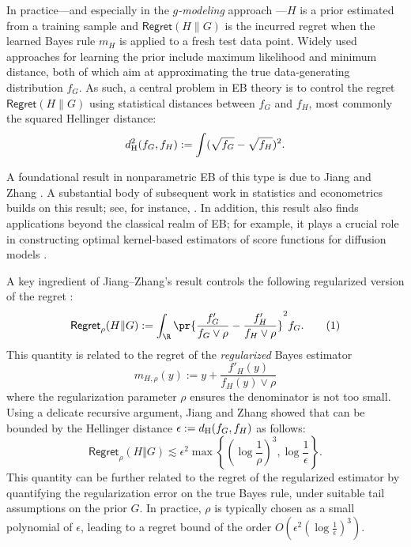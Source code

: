 \documentclass[letterpaper,11pt]{article}
\newcommand\numberthis{\addtocounter{equation}{1}\tag{\theequation}}
\newcommand{\hellinger}{d_{\rm H}}
\newcommand{\pth}[1]{\left( #1 \right)}
\newcommand{\sth}[1]{\left\{ #1 \right\}}
\theoremstyle{definition}
\newcommand{\Regret}{\mathsf{Regret}}
\begin{document}
In practice---and especially in the 
\textit{$g$-modeling} approach  \cite{efron2014two}---$H$ is a prior estimated from a
 training sample and $\Regret(H\|G)$ is the incurred regret when the learned Bayes rule
 $m_H$ is applied to a fresh test data point.
Widely used approaches for learning the prior include maximum likelihood and minimum
distance, both of which aim at approximating the true data-generating distribution $f_G$.
As such, a central problem in EB theory is to control the regret $\Regret(H\|G)$ using
statistical distances between $f_G$ and $f_H$, most commonly the squared Hellinger
distance:
\begin{equation}
  \hellinger^2(f_G,f_H) :=
  \int (\sqrt{f_G}-\sqrt{f_H})^2.
  \label{eq:hellinger}
\end{equation}



A foundational result in nonparametric EB of this type is due to Jiang and Zhang
\cite{JiangZhang2009}.
A substantial body of subsequent work in statistics and econometrics builds on this result; see, for
instance, \cite{jiang2020general,saha2020nonparametric,soloff2025multivariate,SW22,adusumilli2025empirical,ghosh2025stein,chen2026empirical,ignatiadis2026compound,kim2026empirical,chen2026normal}. In addition, this result also finds applications beyond the classical realm of EB; for example, it plays a crucial role in constructing optimal kernel-based estimators of score functions for diffusion models \cite{WWY24}.

A key ingredient
of Jiang--Zhang's result \cite[Lemma 1]{JiangZhang2009}
controls the following regularized version of the regret :
\[
\Regret_{\rho}(H \Vert G) := \int_\R \pr{
  \frac{f'_G}{f_G \vee \rho} - \frac{f'_H}{ f_H \vee \rho}
}^2 f_G .
\numberthis\label{eq:regularized_regret}
\]
This quantity is related to the regret of the \textit{regularized} Bayes estimator
\begin{equation}
 m_{H,\rho}(y) := y + \frac{f'_H(y)}{f_H(y)\vee\rho}
    \label{eq:bayes-rho}
\end{equation}
where the regularization parameter $\rho$ ensures the denominator is not too small.
Using a delicate recursive argument, 
Jiang and Zhang showed that  can be bounded by the Hellinger distance 
$\epsilon := \hellinger(f_G,f_H)$ as follows:
\begin{equation}
\Regret_{\rho}(H \Vert G)
\lesssim \epsilon^2 \max\sth{\pth{\log \frac{1}{\rho}}^3, \log \frac{1}{\epsilon}}.
    \label{eq:JZ09}
\end{equation}
This quantity can be further related to the regret of the regularized estimator  by quantifying the regularization error on the true Bayes rule, under suitable tail assumptions on the prior $G$. 
In practice, $\rho$ is typically chosen as a small polynomial of $\epsilon$, leading to a regret bound of the order $O(\epsilon^2 (\log \frac{1}{\epsilon})^3)$.
\end{document}
